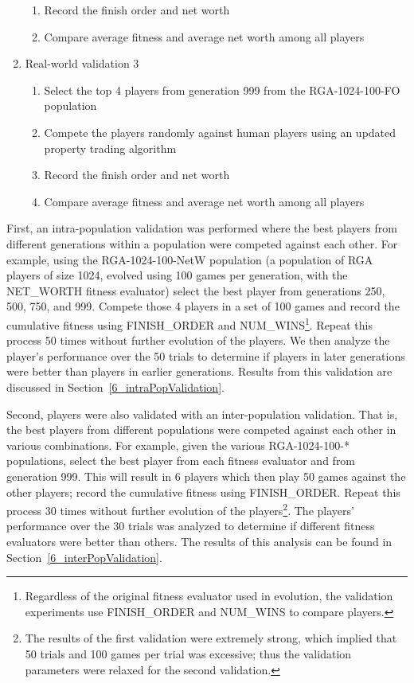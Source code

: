 \begin{enumerate}
\begin{enumerate}
    \item {Record the finish order and net worth}
    \item {Compare average fitness and average net worth among all players}
  \end {enumerate}
  \item {Real-world validation 3}
  \begin{enumerate}
    \item {Select the top 4 players from generation 999 from the RGA-1024-100-FO
    population}
    \item {Compete the players randomly against human players using an updated
    property trading algorithm}
    \item {Record the finish order and net worth}
    \item {Compare average fitness and average net worth among all players}
  \end {enumerate}
\end{enumerate}

First, an intra-population validation was performed where the best players from
different generations within a population were competed against each other.
For example, using the RGA-1024-100-NetW population (a population of RGA players
of size 1024, evolved using 100 games per generation, with the NET\_WORTH
fitness evaluator) select the best player from generations 250, 500, 750, and
999. Compete those 4 players in a set of 100 games and record the cumulative
fitness using FINISH\_ORDER and NUM\_WINS\footnote{Regardless of the original
fitness evaluator used in evolution, the validation experiments use
FINISH\_ORDER and NUM\_WINS to compare players.}. Repeat this process 50 times
without further evolution of the players. We then analyze the player's
performance over the 50 trials to determine if players in later generations were
better than players in earlier generations. Results from this validation are
discussed in Section~\ref{6_intraPopValidation}.

Second, players were also validated with an inter-population validation. That
is, the best players from different populations were competed against each other
in various combinations. For example, given the various RGA-1024-100-*
populations, select the best player from each fitness evaluator and from
generation 999. This will result in 6 players which then play 50 games against
the other players; record the cumulative fitness using FINISH\_ORDER. Repeat
this process 30 times without further evolution of the players\footnote{The
results of the first validation were extremely strong, which implied that 50
trials and 100 games per trial was excessive; thus the validation parameters
were relaxed for the second validation.}. The players' performance over the 30
trials was analyzed to determine if different fitness evaluators were better
than others. The results of this analysis can be found in
Section~\ref{6_interPopValidation}.

